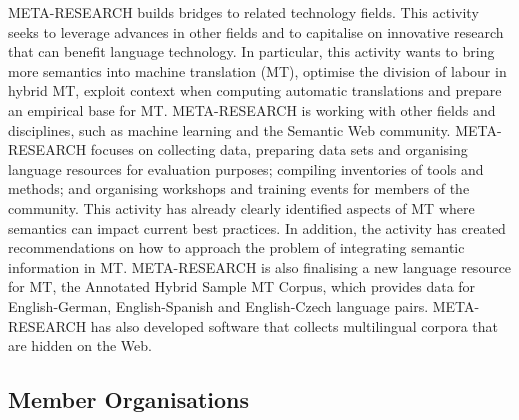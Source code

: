 \documentclass[]{../metanetpaper}
\begin{document}
META-RESEARCH builds bridges to related technology fields. This activity seeks to leverage advances in other fields and to capitalise on innovative research that can benefit language technology. In particular, this activity wants to bring more semantics into machine translation (MT), optimise the division of labour in hybrid MT, exploit context when computing automatic translations and prepare an empirical base for MT. META-RESEARCH is working with other fields and disciplines, such as machine learning and the Semantic Web community. META-RESEARCH focuses on collecting data, preparing data sets and organising language resources for evaluation purposes; compiling inventories of tools and methods; and organising workshops and training events for members of the community. This activity has already clearly identified aspects of MT where semantics can impact current best practices. In addition, the activity has created recommendations on how to approach the problem of integrating semantic information in MT. META-RESEARCH is also finalising a new language resource for MT, the Annotated Hybrid Sample MT Corpus, which provides data for English-German, English-Spanish and English-Czech language pairs. META-RESEARCH has also developed software that collects multilingual corpora that are hidden on the Web.

	\subsection{Member Organisations}
\end{document}
